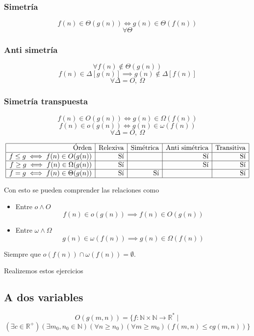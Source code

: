 \subsubsection{Simetría}
$$
	f(n)\in\Theta(g(n))
	\iff
	g(n)\in\Theta(f(n))
$$ $$
	\forall\Theta
$$
\subsubsection{Anti simetría}
$$
	\forall f(n)\not\in \Theta(g(n))
$$ $$
	f(n)\in\Delta[g(n)]
	\implies
	g(n)\not\in\Delta[f(n)] $$ $$
	\forall\Delta= O,~\Omega
$$
\subsubsection{Simetría transpuesta}
$$
	f(n)\in O(g(n))
	\iff
	g(n)\in\Omega(f(n))
$$ $$
	f(n)\in o(g(n))
	\iff
	g(n)\in\omega(f(n)) $$ $$
	\forall\Delta= O,~\Omega
$$
\begin{theorem}
	$$\begin{array} {|r|r|r|r|r|}
			\hline \text{Órden}                    & \text{Relexiva} & \text{Simétrica} & \text{Anti simétrica} & \text{Transitiva} \\
			\hline f\le g\iff f(n)\in O(g(n))      & \text{Sí}       &                  & \text{Sí}             & \text{Sí}         \\
			\hline f\ge g\iff f(n)\in \Omega(g(n)) & \text{Sí}       &                  & \text{Sí}             & \text{Sí}         \\
			\hline f= g\iff f(n)\in \Theta(g(n))   & \text{Sí}       & \text{Sí}        &                       & \text{Sí}         \\
			\hline
		\end{array}$$

	Con esto se pueden comprender las relaciones como
	\begin{itemize}
		\item Entre $o\land O$
		      $$  f(n)\in o(g(n)) \implies f(n)\in O(g(n))  $$
		\item Entre $\omega\land\Omega$
		      $$  g(n)\in \omega(f(n)) \implies g(n)\in \Omega(f(n))  $$
	\end{itemize}
	Siempre que $o(f(n))\cap \omega(f(n))=\emptyset$.
\end{theorem}

\begin{example}
	Realizemos estos ejercicios
\end{example}

\subsection{A dos variables}
\begin{definition}
	$$O(g(m,n))=\{f:\mathbb N\times \mathbb N\to \mathbb R^*~|~
	$$ $$
		(\exists c\in \mathbb R^+)
		(\exists  m_0 , n_0 \in \mathbb N)
		(\forall  n\ge  n_0)
		(\forall  m\ge  m_0)
		(f(m, n) \le  c g(m, n))
		\}
	$$
\end{definition}

